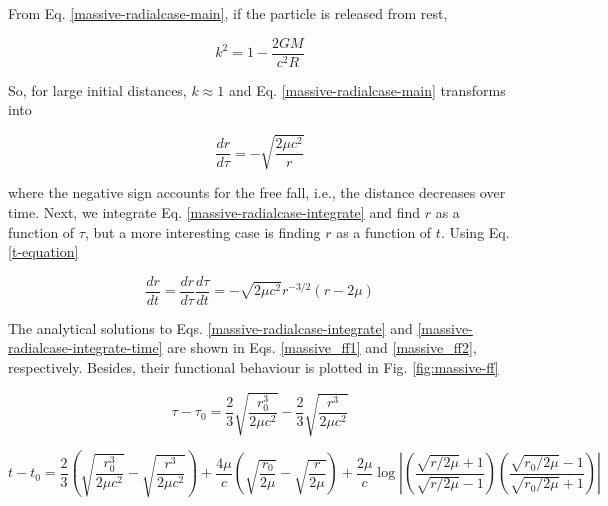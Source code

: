 \documentclass[letterpaper,11pt,onecolumn]{article}
\begin{document}
From Eq. \ref{massive-radialcase-main}, if the particle is released from rest, 

\begin{equation*}
    k^2 = 1 - \frac{2GM}{c^2 R}
\end{equation*}

So, for large initial distances, $k \approx 1$ and Eq. \ref{massive-radialcase-main} transforms into 

\begin{equation} \label{massive-radialcase-integrate}
    \frac{dr}{d\tau} = - \sqrt{\frac{2\mu c^2}{r}}
\end{equation}

where the negative sign accounts for the free fall, i.e., the distance decreases over time. Next, we integrate Eq. \ref{massive-radialcase-integrate} and find $r$ as a function of $\tau$, but a more interesting case is finding $r$ as a function of $t$. Using Eq. \ref{t-equation}

\begin{equation} \label{massive-radialcase-integrate-time}
    \frac{dr}{dt} = \frac{dr}{d\tau} \frac{d\tau}{dt} = - \sqrt{2\mu c^2} r^{-3/2} (r - 2\mu)
\end{equation}

The analytical solutions to Eqs. \ref{massive-radialcase-integrate} and \ref{massive-radialcase-integrate-time} are shown in Eqs. \ref{massive_ff1} and \ref{massive_ff2}, respectively. Besides, their functional behaviour is plotted in Fig. \ref{fig:massive-ff}

\begin{equation} \label{massive_ff1}
    \tau - \tau_0 = \frac23 \sqrt{\frac{r_0^3}{2\mu c^2}} -  \frac23 \sqrt{\frac{r^3}{2\mu c^2}} \label{28}
\end{equation}

\begin{equation} \label{massive_ff2}
    t - t_0 = \frac23 \left( \sqrt{\frac{r_0^3}{2\mu c^2}} - \sqrt{\frac{r^3}{2\mu c^2}} \right) + \frac{4 \mu}{c}  \left( \sqrt{\frac{r_0}{2\mu}} - \sqrt{\frac{r}{2\mu}} \right) + \frac{2\mu}{c} \log \left| \left( \frac{\sqrt{r/2\mu} + 1}{\sqrt{r/2\mu} - 1} \right) \left( \frac{\sqrt{r_0/2\mu} - 1}{\sqrt{r_0/2\mu} + 1} \right)  \right| \label{29}
\end{equation}
\end{document}
